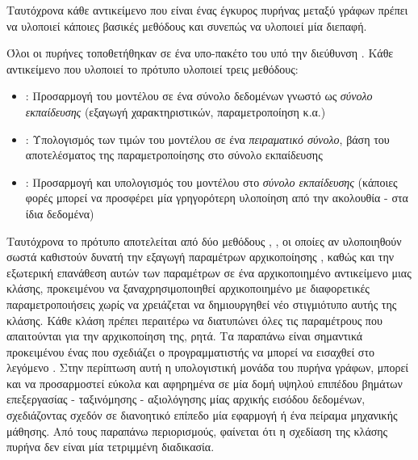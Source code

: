 Ταυτόχρονα κάθε αντικείμενο που είναι ένας έγκυρος πυρήνας μεταξύ γράφων πρέπει να υλοποιεί κάποιες βασικές μεθόδους και συνεπώς να υλοποιεί μία διεπαφή.\par
Όλοι οι πυρήνες τοποθετήθηκαν σε ένα υπο-πακέτο του  υπό την διεύθυνση .
Κάθε αντικείμενο που υλοποιεί το πρότυπο  υλοποιεί τρεις μεθόδους:
  \begin{itemize}
    \item \texttt{}: Προσαρμογή του μοντέλου σε ένα σύνολο δεδομένων γνωστό ως \textit{σύνολο εκπαίδευσης} (εξαγωγή χαρακτηριστικών, παραμετροποίηση κ.α.)
    \item \texttt{}: Υπολογισμός των τιμών του μοντέλου σε ένα \textit{πειραματικό σύνολο}, βάση του αποτελέσματος της παραμετροποίησης στο σύνολο εκπαίδευσης
    \item \texttt{}: Προσαρμογή και υπολογισμός του μοντέλου στο \textit{σύνολο εκπαίδευσης} (κάποιες φορές μπορεί να προσφέρει μία γρηγορότερη υλοποίηση από την ακολουθία \texttt{} - \texttt{} στα ίδια δεδομένα)
\end{itemize}
Ταυτόχρονα το πρότυπο  αποτελείται από δύο μεθόδους \texttt{}, \texttt{}, οι οποίες αν υλοποιηθούν σωστά καθιστούν δυνατή την εξαγωγή παραμέτρων αρχικοποίησης , καθώς και την εξωτερική επανάθεση αυτών των παραμέτρων σε ένα αρχικοποιημένο αντικείμενο μιας κλάσης, προκειμένου να ξαναχρησιμοποιηθεί αρχικοποιημένο με διαφορετικές παραμετροποιήσεις χωρίς να χρειάζεται να δημιουργηθεί νέο στιγμιότυπο αυτής της κλάσης.
Κάθε κλάση πρέπει περαιτέρω να διατυπώνει όλες τις παραμέτρους που απαιτούνται για την αρχικοποίηση της, ρητά.
Τα παραπάνω είναι σημαντικά προκειμένου ένας  που σχεδιάζει ο προγραμματιστής να μπορεί να εισαχθεί στο λεγόμενο .
Στην περίπτωση αυτή η υπολογιστική μονάδα του πυρήνα γράφων, μπορεί και να προσαρμοστεί εύκολα και αφηρημένα σε μία δομή υψηλού επιπέδου βημάτων επεξεργασίας - ταξινόμησης - αξιολόγησης μίας αρχικής εισόδου δεδομένων, σχεδιάζοντας σχεδόν σε διανοητικό επίπεδο μία εφαρμογή ή ένα πείραμα μηχανικής μάθησης.
Από τους παραπάνω περιορισμούς, φαίνεται ότι η σχεδίαση της κλάσης πυρήνα δεν είναι μία τετριμμένη διαδικασία.
